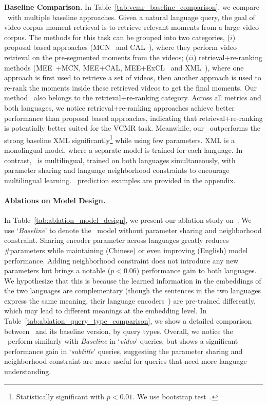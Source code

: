 \noindent\textbf{Baseline Comparison.}
In Table~\ref{tab:vcmr_baseline_comparison}, we compare \ModelName~with multiple baseline approaches. 
Given a natural language query, the goal of video corpus moment retrieval is to retrieve relevant moments from a large video corpus.
The methods for this task can be grouped into two categories, ($i$) proposal based approaches (MCN~\cite{anne2017localizing} and CAL~\cite{escorcia2019temporal}), where they perform video retrieval on the pre-segmented moments from the videos; ($ii$) retrieval+re-ranking methods (MEE~\cite{miech2018learning}+MCN, MEE+CAL, MEE+ExCL~\cite{ghosh2019excl} and XML~\cite{lei2020tvr}), where one approach is first used to retrieve a set of videos, then another approach is used to re-rank the moments inside these retrieved videos to get the final moments.
Our method \ModelName~also belongs to the retrieval+re-ranking category.
Across all metrics and both languages, we notice retrieval+re-ranking approaches achieve better performance than proposal based approaches, indicating that retrieval+re-ranking is potentially better suited for the VCMR task.
Meanwhile, our \ModelName~outperforms the strong baseline XML significantly\footnote{Statistically significant with $p{<}0.01$. We use bootstrap test~\cite{efron1994introduction,noreen1989computer}.} while using few parameters.
XML is a monolingual model, where a separate model is trained for each language. 
In contrast, \ModelName~is multilingual, trained on both languages simultaneously, with parameter sharing and language neighborhood constraints to encourage multilingual learning. 
\ModelName~prediction examples are provided in the appendix.



\paragraph{Ablations on Model Design.} 
In Table~\ref{tab:ablation_model_design}, we present our ablation study on~\ModelName. 
We use `\textit{Baseline}' to denote the~\ModelName{} model without parameter sharing and neighborhood constraint. 
Sharing encoder parameter across languages greatly reduces \#parameters while maintaining (Chinese) or even improving (English) model performance.
Adding neighborhood constraint does not introduce any new parameters but brings a notable ($p{<}0.06$) performance gain to both languages.
We hypothesize that this is because the learned information in the embeddings of the two languages are complementary (though the sentences in the two languages express the same meaning, their language encoders~\cite{liu2019roberta,cui2020revisiting}) are pre-trained differently, which may lead to different meanings at the embedding level.
In Table~\ref{tab:ablation_query_type_comparison}, we show a detailed comparison between~\ModelName{} and its baseline version, by query types. 
Overall, we notice the \ModelName~perform similarly with \textit{Baseline} in `\textit{video}' queries, but shows a significant performance gain in `\textit{subtitle}' queries, suggesting the parameter sharing and neighborhood constraint are more useful for queries that need more language understanding.


